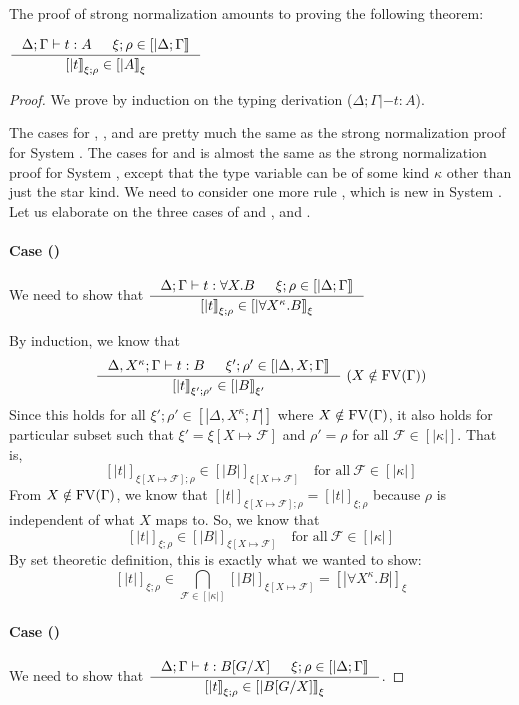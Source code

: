 The proof of strong normalization amounts to proving the following theorem:
\begin{theorem}
$ \inference{\Delta;\Gamma|- t:A & \xi;\rho \in [|\Delta;\Gamma|]}
            {[|t|]_{\xi;\rho} \in [|A|]_\xi} $
\end{theorem}
\begin{proof}
We prove by induction on the typing derivation ($\Delta;\Gamma |- t:A$).

The cases for , , and  are pretty
much the same as the strong normalization proof for System \F.
The cases for  and  is almost the same
as the strong normalization proof for System \F, except that the type variable
can be of some kind $\kappa$ other than just the star kind.
We need to consider one more rule , which is new in System \Fw.
Let us elaborate on the three cases of
 and , and .

\paragraph{Case ()}
We need to show that
$ \inference{\Delta;\Gamma |- t : \forall X.B & \xi;\rho\in[|\Delta;\Gamma|]}
        {[|t|]_{\xi;\rho} \in [|\forall X^\kappa.B|]_\xi} $

By induction, we know that
\[ \inference{\Delta,X^\kappa;\Gamma |- t:B & \xi';\rho'\in[|\Delta,X;\Gamma|]}
        {[|t|]_{\xi';\rho'} \in [|B|]_{\xi'}} ~
        (X\notin\FV(\Gamma))
\]
Since this holds for all $\xi';\rho' \in [|\Delta,X^\kappa;\Gamma|]$ where
$X\notin\mathop{\mathrm{FV}}(\Gamma)$, it also holds for particular subset such that
$\xi' = \xi[X\mapsto\mathcal{F}]$ and $\rho'=\rho$ for all $\mathcal{F}\in[|\kappa|]$.
That is,
\[ [|t|]_{\xi[X\mapsto\mathcal{F}];\rho} \in [|B|]_{\xi[X\mapsto\mathcal{F}]}
        \quad \text{for all}~\mathcal{F}\in[|\kappa|] \]
From $X\notin\mathop{\mathrm{FV}}(\Gamma)$, we know that
$[|t|]_{\xi[X\mapsto\mathcal{F}];\rho} = [|t|]_{\xi;\rho}$
because $\rho$ is independent of what $X$ maps to.
So, we know that
\[ [|t|]_{\xi;\rho} \in [|B|]_{\xi[X\mapsto\mathcal{F}]}
        \quad \text{for all}~\mathcal{F}\in[|\kappa|] \]
By set theoretic definition, this is exactly what we wanted to show:
\[ [|t|]_{\xi;\rho} \in
        \bigcap_{\mathcal{F}\in[|\kappa|]} [|B|]_{\xi[X\mapsto\mathcal{F}]}
        = [|\forall X^\kappa.B|]_\xi
\]

\paragraph{Case ()}
We need to show that
$ \inference{\Delta;\Gamma |- t : B[G/X] & \xi;\rho\in[|\Delta;\Gamma|]}
        {[|t|]_{\xi;\rho} \in [|B[G/X]|]_\xi} $.


\end{proof}
